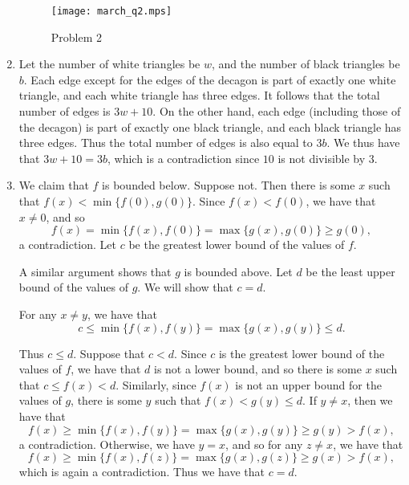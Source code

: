 \documentclass[12pt]{article}
\begin{document}
\begin{enumerate}
\begin{figure}[!ht]
\centering
\texttt{[image: march\_q2.mps]}
\caption{Problem 2}
\end{figure}


\item %

%
Let the number of white triangles be $w$, and the number of black triangles be
$b$. Each edge except for the edges of the decagon is part of exactly one white
triangle, and each white triangle has three edges. It follows that the total
number of edges is $3w + 10$. On the other hand, each edge (including those of
the decagon) is part of exactly one black triangle, and each black triangle has
three edges. Thus the total number of edges is also equal to $3b$. We thus have
that $3w + 10 = 3b$, which is a contradiction since $10$ is not divisible by
$3$.


\item %
We claim that $f$ is bounded below. Suppose not. Then there is some $x$ such
that $f(x) < \min\{f(0), g(0) \}$. Since $f(x) < f(0)$, we have that $x \neq 0$,
and so
\[
    f(x) = \min\{ f(x), f(0) \} = \max\{ g(x), g(0) \} \geq g(0),
\]
a contradiction. Let $c$ be the greatest lower bound of the values of $f$.

A similar argument shows that $g$ is bounded above. Let $d$ be the least upper
bound of the values of $g$. We will show that $c = d$.

For any $x \neq y$, we have that
\[
    c \leq \min\{ f(x), f(y) \} = \max\{ g(x), g(y) \} \leq d.   
\]

Thus $c \leq d$. Suppose that $c < d$. Since $c$ is the greatest lower bound of
the values of $f$, we have that $d$ is not a lower bound, and so there is some
$x$ such that $c \leq f(x) < d$. Similarly, since $f(x)$ is not an upper bound
for the values of $g$, there is some $y$ such that $f(x) < g(y) \leq d$. If $y
\neq x$, then we have that
\[
    f(x) \geq \min\{ f(x), f(y) \} = \max\{ g(x), g(y) \} \geq g(y) > f(x),
\]
a contradiction. Otherwise, we have $y = x$, and so for any $z \neq x$, we have
that
\[
    f(x) \geq \min\{ f(x), f(z) \} = \max\{ g(x), g(z) \} \geq g(x) > f(x),
\]
which is again a contradiction. Thus we have that $c = d$.


\end{enumerate}
\end{document}
